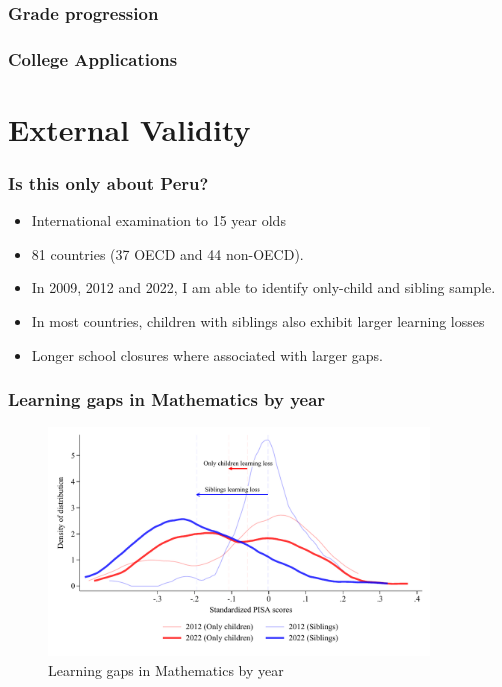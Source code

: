\documentclass{beamer}
\begin{document}
    \begin{frame}
            \label{frame:grade_progression}
            \frametitle{Grade progression}
    \end{frame}   

    \begin{frame}
            \label{frame:college_app}
            \frametitle{College Applications}
    \end{frame}      

\section{External Validity}

    \begin{frame}
            \label{frame:pisadata}
            \frametitle{Is this only about Peru?}
        \begin{itemize}
            \item International examination to 15 year olds
            \item 81 countries (37 OECD and 44 non-OECD).
            \item In 2009, 2012 and 2022, I am able to identify only-child and sibling sample.
            \item In most countries, children with siblings also exhibit larger learning losses
            \item Longer school closures where associated with larger gaps.
        \end{itemize}
    \end{frame}

\begin{frame}
    \label{frame:pisagaps}
    \frametitle{Learning gaps in Mathematics by year}
    
    \begin{figure}
        \centering
        \includegraphics[width=0.9\textwidth]{./FIGURES/Descriptive/PISA_distribution_2012_2022_PV4MATH.pdf}
        \caption{Learning gaps in Mathematics by year}
        \label{fig:1a}
    \end{figure}
    
\end{frame}
\end{document}
